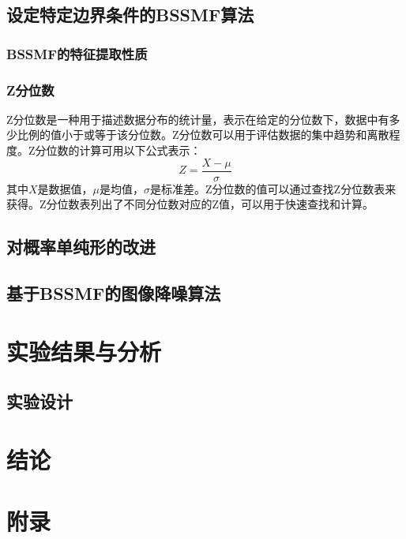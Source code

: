\documentclass[12pt]{article}
\begin{document}
\subsection{设定特定边界条件的BSSMF算法}
\subsubsection{BSSMF的特征提取性质}
\subsubsection{Z分位数}
Z分位数是一种用于描述数据分布的统计量，表示在给定的分位数下，数据中有多少比例的值小于或等于该分位数。Z分位数可以用于评估数据的集中趋势和离散程度。Z分位数的计算可用以下公式表示：
\begin{equation}
    Z = \frac{X - \mu}{\sigma}
\end{equation}
其中$X$是数据值，$\mu$是均值，$\sigma$是标准差。Z分位数的值可以通过查找Z分位数表来获得。Z分位数表列出了不同分位数对应的Z值，可以用于快速查找和计算。

\subsection{对概率单纯形的改进}

\subsection{基于BSSMF的图像降噪算法}

\section{实验结果与分析}
\subsection{实验设计}

\section{结论}




\appendix
\section*{\centering \Huge 附录}
\end{document}
